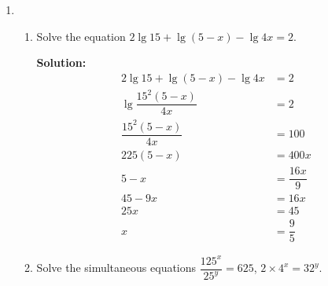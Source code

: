 \documentclass{report}
\newcommand{\sol}{\vspace{0.2cm}\textbf{Solution:}\vspace{0.2cm}}
\begin{document}
\begin{multicols*}{2}
\begin{enumerate}[leftmargin=*]
        \item \begin{enumerate}
                  \item Solve the equation $2 \lg 15+\lg (5-x)-\lg 4 x=2$.

                        \sol{}
                        \begin{align*}
                            2 \lg 15 + \lg (5-x) - \lg 4x & = 2              \\
                            \lg \dfrac{15^2(5-x)}{4x}     & = 2              \\
                            \dfrac{15^2(5-x)}{4x}         & = 100            \\
                            225(5-x)                      & = 400x           \\
                            5 - x                         & = \dfrac{16x}{9} \\
                            45 - 9x                       & = 16x            \\
                            25x                           & = 45             \\
                            x                             & = \dfrac{9}{5}
                        \end{align*}

                  \item Solve the simultaneous equations $\dfrac{125^{x}}{25^{y}}=625$, $2 \times
                            4^{x}=32^{y}$.


\end{enumerate}
\end{enumerate}
\end{multicols*}
\end{document}
